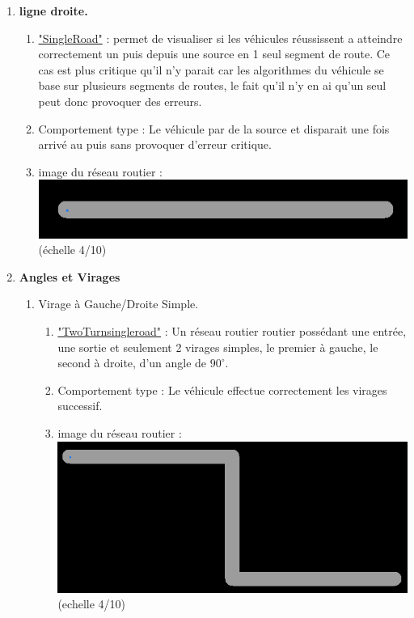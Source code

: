 \documentclass[a4paper,11pt]{article}
\newcommand{\orto}{^{\circ}}
\begin{document}
\begin{enumerate}[label=-]
\begin{enumerate}[label=\Alph*)]
\begin{enumerate}[label=$\square$]
\end{enumerate}
\end{enumerate}
\item \textbf{ligne droite.}
\begin{enumerate}[label=$\square$]
\item \underline{"SingleRoad"} : permet de visualiser si les véhicules réussissent a atteindre correctement un puis depuis une source en 1 seul segment de route. Ce cas est plus critique qu'il n'y parait car les algorithmes du véhicule se base sur plusieurs segments de routes, le fait qu'il n'y en ai qu'un seul peut donc provoquer des erreurs.

\item Comportement type : Le véhicule par de la source et disparait une fois arrivé au puis sans provoquer d'erreur critique.

\item image du réseau routier : \\
\includegraphics[scale=0.4]{SingleRoad.png}(échelle 4/10)

\end{enumerate}
\item \textbf{Angles et Virages}
\begin{enumerate}[label=\Alph*)]
\item Virage à Gauche/Droite Simple.


\begin{enumerate}[label=$\square$]
\item \underline{"TwoTurnsingleroad"} : Un réseau routier routier possédant une entrée, une sortie et seulement 2 virages simples, le premier à gauche, le second à droite, d'un angle de $90\orto$.
\item Comportement type : Le véhicule effectue correctement les virages successif.
\item image du réseau routier :\\
\includegraphics[scale=0.4]{TwoTurnsingleroad.png}(echelle 4/10)
\end{enumerate} %


\end{enumerate}
\end{enumerate}
\end{document}
